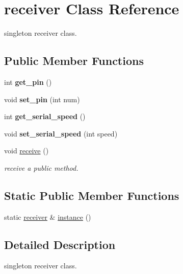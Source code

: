 \hypertarget{classreceiver}{}\section{receiver Class Reference}
\label{classreceiver}


singleton receiver class.  


\subsection*{Public Member Functions}
\begin{DoxyCompactItemize}
\item 
\mbox{\label{classreceiver_a53ba0b715f1b1f2e99e1b59567b537cf}} 
int {\bfseries get\+\_\+pin} ()
\item 
\mbox{\label{classreceiver_a5f97c85e8548e022c80e6b10ba285333}} 
void {\bfseries set\+\_\+pin} (int num)
\item 
\mbox{\label{classreceiver_a03060955e9dffcf8d7878bb67a576286}} 
int {\bfseries get\+\_\+serial\+\_\+speed} ()
\item 
\mbox{\label{classreceiver_ab4f731a1fe7a601ea1f906bbd1133b2b}} 
void {\bfseries set\+\_\+serial\+\_\+speed} (int speed)
\item 
void \hyperlink{classreceiver_a68ac5dfbbc83c438998fb859d0532750}{receive} ()
\begin{DoxyCompactList}\small\item\em receive a public method. \end{DoxyCompactList}\end{DoxyCompactItemize}
\subsection*{Static Public Member Functions}
\begin{DoxyCompactItemize}
\item 
static \hyperlink{classreceiver}{receiver} \& \hyperlink{classreceiver_acf3d61c94a47ebfbc2ec416c24d492fd}{instance} ()
\end{DoxyCompactItemize}


\subsection{Detailed Description}
singleton receiver class. 

